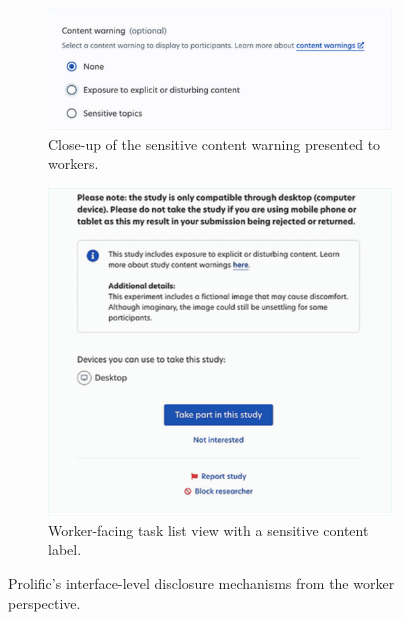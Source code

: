 \begin{figure}
  \centering
  \begin{subfigure}[b]{0.48\linewidth}
    \centering
    \includegraphics[width=\linewidth]{figures/prolific_zoomedin_binary.pdf}
    \caption{Close-up of the sensitive content warning presented to workers.}
    \label{fig:prolific_zoomed}
  \end{subfigure}
  \hfill
  \begin{subfigure}[b]{0.48\linewidth}
    \centering
    \includegraphics[width=\linewidth]{figures/prolific_worker_side_example.pdf}
    \caption{Worker-facing task list view with a sensitive content label.}
    \label{fig:prolific_worker}
  \end{subfigure}
  \caption{Prolific’s interface-level disclosure mechanisms from the worker perspective.}
  \label{fig:prolific_worker_pair}
\end{figure}

